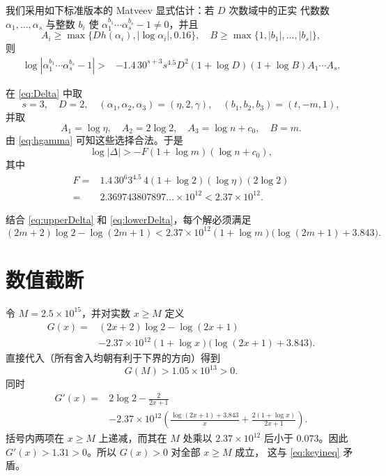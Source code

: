 \documentclass[11pt,a4paper]{ctexart}
\theoremstyle{remark}
\begin{document}
我们采用如下标准版本的 Matveev 显式估计：若 \(D\) 次数域中的正实
代数数 \(\alpha_1,\ldots,\alpha_s\) 与整数 \(b_i\) 使
\(\alpha_1^{b_1}\cdots\alpha_s^{b_s}-1\ne0\)，并且
\[
 A_i\ge\max\{Dh(\alpha_i),|\log\alpha_i|,0.16\},
 \quad B\ge\max\{1,|b_1|,\ldots,|b_s|\},
\]
则
\begin{align}\label{eq:matveev}
 \log|\alpha_1^{b_1}\cdots\alpha_s^{b_s}-1|
 {}>&-1.4\,30^{s+3}s^{4.5}D^2(1+\log D)(1+\log B)
       A_1\cdots A_s.
\end{align}

在 \eqref{eq:Delta} 中取
\[
 s=3,\quad D=2,\quad
 (\alpha_1,\alpha_2,\alpha_3)=(\eta,2,\gamma),\quad
 (b_1,b_2,b_3)=(t,-m,1),
\]
并取
\[
 A_1=\log\eta,\quad A_2=2\log2,\quad
 A_3=\log n+c_0,\quad B=m.
\]
由 \eqref{eq:hgamma} 可知这些选择合法。于是
\begin{equation}\label{eq:lowerDelta}
 \log|\Delta|>
 -F(1+\log m)(\log n+c_0),
\end{equation}
其中
\begin{align*}
 F={}&1.4\,30^6 3^{4.5}\,4(1+\log2)
       (\log\eta)(2\log2)\\
  ={}&2.369743807897\ldots\times10^{12}
   <2.37\times10^{12}.
\end{align*}

结合 \eqref{eq:upperDelta} 和 \eqref{eq:lowerDelta}，每个解必须满足
\begin{equation}\label{eq:keyineq}
 (2m+2)\log2-\log(2m+1)
 <2.37\times10^{12}(1+\log m)
      \bigl(\log(2m+1)+3.843\bigr).
\end{equation}

\section{数值截断}

令 \(M=2.5\times10^{15}\)，并对实数 \(x\ge M\) 定义
\begin{align*}
 G(x)={}&(2x+2)\log2-\log(2x+1)\\
 &-2.37\times10^{12}(1+\log x)
       \bigl(\log(2x+1)+3.843\bigr).
\end{align*}
直接代入（所有舍入均朝有利于下界的方向）得到
\[
 G(M)>1.05\times10^{13}>0.
\]
同时
\begin{align*}
G'(x)={}&2\log2-\frac2{2x+1}\\
&-2.37\times10^{12}\left(
 \frac{\log(2x+1)+3.843}{x}
 +\frac{2(1+\log x)}{2x+1}\right).
\end{align*}
括号内两项在 \(x\ge M\) 上递减，而其在 \(M\) 处乘以
\(2.37\times10^{12}\) 后小于 \(0.073\)。因此
\(G'(x)>1.31>0\)。所以 \(G(x)>0\) 对全部 \(x\ge M\) 成立，
这与 \eqref{eq:keyineq} 矛盾。
\end{document}

